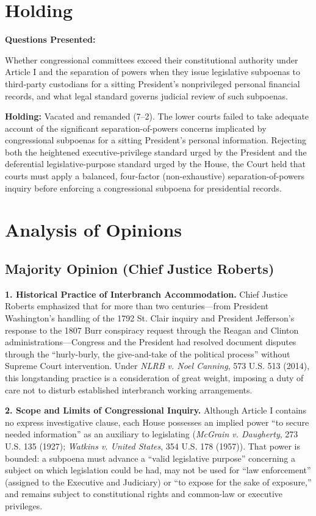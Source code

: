 \documentclass[12pt]{article}
\begin{document}
\section{Holding}
\textbf{Questions Presented:}

Whether congressional committees exceed their constitutional authority under Article I and the separation of powers when they issue legislative subpoenas to third-party custodians for a sitting President's nonprivileged personal financial records, and what legal standard governs judicial review of such subpoenas.

\textbf{Holding:} Vacated and remanded (7--2). The lower courts failed to take adequate account of the significant separation-of-powers concerns implicated by congressional subpoenas for a sitting President's personal information. Rejecting both the heightened executive-privilege standard urged by the President and the deferential legislative-purpose standard urged by the House, the Court held that courts must apply a balanced, four-factor (non-exhaustive) separation-of-powers inquiry before enforcing a congressional subpoena for presidential records.

\section{Analysis of Opinions}
\subsection{Majority Opinion (Chief Justice Roberts)}

\textbf{1. Historical Practice of Interbranch Accommodation.} Chief Justice Roberts emphasized that for more than two centuries---from President Washington's handling of the 1792 St. Clair inquiry and President Jefferson's response to the 1807 Burr conspiracy request through the Reagan and Clinton administrations---Congress and the President had resolved document disputes through the ``hurly-burly, the give-and-take of the political process'' without Supreme Court intervention. Under \textit{NLRB v. Noel Canning}, 573 U.S. 513 (2014), this longstanding practice is a consideration of great weight, imposing a duty of care not to disturb established interbranch working arrangements.

\textbf{2. Scope and Limits of Congressional Inquiry.} Although Article I contains no express investigative clause, each House possesses an implied power ``to secure needed information'' as an auxiliary to legislating (\textit{McGrain v. Daugherty}, 273 U.S. 135 (1927); \textit{Watkins v. United States}, 354 U.S. 178 (1957)). That power is bounded: a subpoena must advance a ``valid legislative purpose'' concerning a subject on which legislation could be had, may not be used for ``law enforcement'' (assigned to the Executive and Judiciary) or ``to expose for the sake of exposure,'' and remains subject to constitutional rights and common-law or executive privileges.
\end{document}

